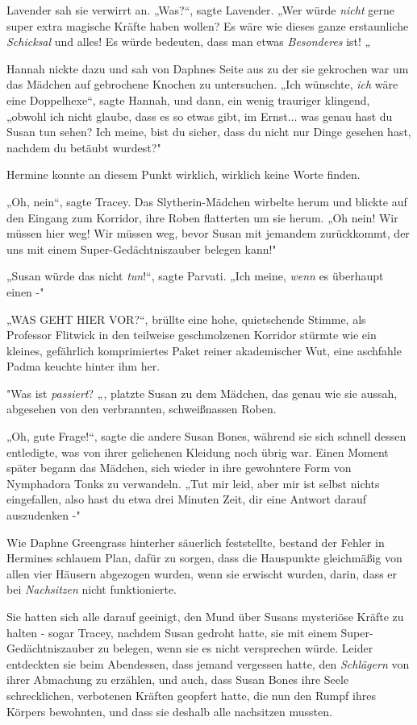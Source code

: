 {Lavender sah sie verwirrt an. „Was?“, sagte Lavender. „Wer würde \emph{nicht} gerne super extra magische Kräfte haben wollen? Es wäre wie dieses ganze erstaunliche \emph{Schicksal} und alles! Es würde bedeuten, dass man etwas \emph{Besonderes} ist! „

Hannah nickte dazu und sah von Daphnes Seite aus zu der sie gekrochen war um das Mädchen auf gebrochene Knochen zu untersuchen. „Ich wünschte, \emph{ich} wäre eine Doppelhexe“, sagte Hannah, und dann, ein wenig trauriger klingend, „obwohl ich nicht glaube, dass es so etwas gibt, im Ernst... was genau hast du Susan tun sehen? Ich meine, bist du sicher, dass du nicht nur Dinge gesehen hast, nachdem du betäubt wurdest?"

Hermine konnte an diesem Punkt wirklich, wirklich keine Worte finden.

„Oh, nein“, sagte Tracey. Das Slytherin-Mädchen wirbelte herum und blickte auf den Eingang zum Korridor, ihre Roben flatterten um sie herum. „Oh nein! Wir müssen hier weg! Wir müssen weg, bevor Susan mit jemandem zurückkommt, der uns mit einem Super-Gedächtniszauber belegen kann!"

„Susan würde das nicht \emph{tun}!“, sagte Parvati. „Ich meine, \emph{wenn} es überhaupt einen -"

„WAS GEHT HIER VOR?“, brüllte eine hohe, quietschende Stimme, als Professor Flitwick in den teilweise geschmolzenen Korridor stürmte wie ein kleines, gefährlich komprimiertes Paket reiner akademischer Wut, eine aschfahle Padma keuchte hinter ihm her.

\hfill\break "Was ist \emph{passiert}? „, platzte Susan zu dem Mädchen, das genau wie sie aussah, abgesehen von den verbrannten, schweißnassen Roben.

„Oh, gute Frage!“, sagte die andere Susan Bones, während sie sich schnell dessen entledigte, was von ihrer geliehenen Kleidung noch übrig war. Einen Moment später begann das Mädchen, sich wieder in ihre gewohntere Form von Nymphadora Tonks zu verwandeln. „Tut mir leid, aber mir ist selbst nichts eingefallen, also hast du etwa drei Minuten Zeit, dir eine Antwort darauf auszudenken -"

\hfill\break Wie Daphne Greengrass hinterher säuerlich feststellte, bestand der Fehler in Hermines schlauem Plan, dafür zu sorgen, dass die Hauspunkte gleichmäßig von allen vier Häusern abgezogen wurden, wenn sie erwischt wurden, darin, dass er bei \emph{Nachsitzen} nicht funktionierte.

Sie hatten sich alle darauf geeinigt, den Mund über Susans mysteriöse Kräfte zu halten - sogar Tracey, nachdem Susan gedroht hatte, sie mit einem Super-Gedächtniszauber zu belegen, wenn sie es nicht versprechen würde. Leider entdeckten sie beim Abendessen, dass jemand vergessen hatte, den \emph{Schlägern} von ihrer Abmachung zu erzählen, und auch, dass Susan Bones ihre Seele schrecklichen, verbotenen Kräften geopfert hatte, die nun den Rumpf ihres Körpers bewohnten, und dass sie deshalb alle nachsitzen mussten.

}
